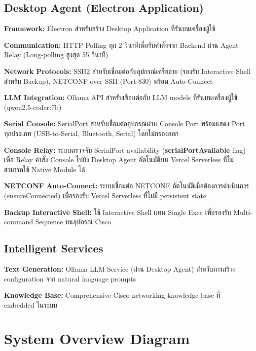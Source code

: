 \subsection{Desktop Agent (Electron Application)}
\begin{mycustomitem2}
    \item \textbf{Framework:} Electron สำหรับสร้าง Desktop Application ที่รันบนเครื่องผู้ใช้
    \item \textbf{Communication:} HTTP Polling ทุก 2 วินาทีเพื่อรับคำสั่งจาก Backend ผ่าน Agent Relay (Long-polling สูงสุด 55 วินาที)
    \item \textbf{Network Protocols:} SSH2 สำหรับเชื่อมต่อกับอุปกรณ์เครือข่าย (รองรับ Interactive Shell สำหรับ Backup), NETCONF over SSH (Port 830) พร้อม Auto-Connect
    \item \textbf{LLM Integration:} Ollama API สำหรับเชื่อมต่อกับ LLM models ที่รันบนเครื่องผู้ใช้ (qwen2.5-coder:7b)
    \item \textbf{Serial Console:} SerialPort สำหรับเชื่อมต่ออุปกรณ์ผ่าน Console Port พร้อมแสดง Port ทุกประเภท (USB-to-Serial, Bluetooth, Serial) โดยไม่กรองออก
    \item \textbf{Console Relay:} ระบบตรวจจับ SerialPort availability (\textbf{serialPortAvailable} flag) เพื่อ Relay คำสั่ง Console ไปยัง Desktop Agent อัตโนมัติบน Vercel Serverless ที่ไม่สามารถใช้ Native Module ได้
    \item \textbf{NETCONF Auto-Connect:} ระบบเชื่อมต่อ NETCONF อัตโนมัติเมื่อต้องการดำเนินการ (ensureConnected) เพื่อรองรับ Vercel Serverless ที่ไม่มี persistent state
    \item \textbf{Backup Interactive Shell:} ใช้ Interactive Shell แทน Single Exec เพื่อรองรับ Multi-command Sequence บนอุปกรณ์ Cisco
\end{mycustomitem2}

\subsection{Intelligent Services}
\begin{mycustomitem2}
    \item \textbf{Text Generation:} Ollama LLM Service (ผ่าน Desktop Agent) สำหรับการสร้าง configuration จาก natural language prompts
    \item \textbf{Knowledge Base:} Comprehensive Cisco networking knowledge base ที่ embedded ในระบบ
\end{mycustomitem2}


\section{System Overview Diagram}


